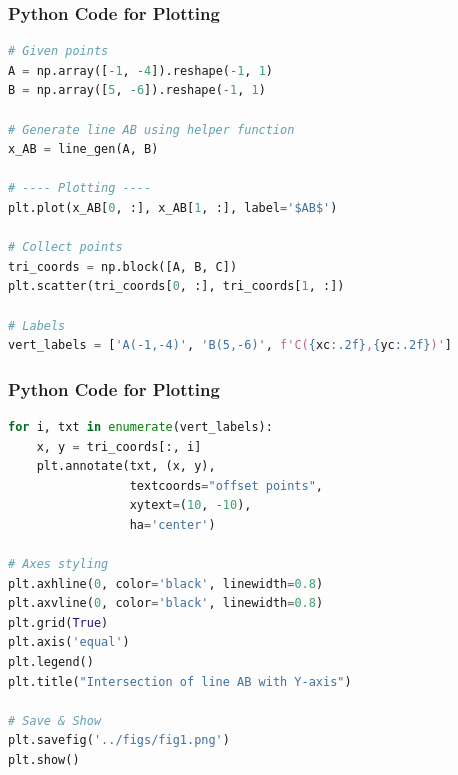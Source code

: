 \documentclass{beamer}
\theoremstyle{remark}
\numberwithin{equation}{section}
\begin{document}
\begin{frame}[fragile]
\frametitle{Python Code for Plotting}
\begin{lstlisting}[language=Python]
# Given points
A = np.array([-1, -4]).reshape(-1, 1)
B = np.array([5, -6]).reshape(-1, 1)

# Generate line AB using helper function
x_AB = line_gen(A, B)

# ---- Plotting ----
plt.plot(x_AB[0, :], x_AB[1, :], label='$AB$')

# Collect points
tri_coords = np.block([A, B, C])
plt.scatter(tri_coords[0, :], tri_coords[1, :])

# Labels
vert_labels = ['A(-1,-4)', 'B(5,-6)', f'C({xc:.2f},{yc:.2f})']
\end{lstlisting}
\end{frame}

\begin{frame}[fragile]
\frametitle{Python Code for Plotting}
\begin{lstlisting}[language=Python]
for i, txt in enumerate(vert_labels):
    x, y = tri_coords[:, i]
    plt.annotate(txt, (x, y),
                 textcoords="offset points",
                 xytext=(10, -10),
                 ha='center')

# Axes styling
plt.axhline(0, color='black', linewidth=0.8)
plt.axvline(0, color='black', linewidth=0.8)
plt.grid(True)
plt.axis('equal')
plt.legend()
plt.title("Intersection of line AB with Y-axis")

# Save & Show
plt.savefig('../figs/fig1.png')
plt.show()
\end{lstlisting}
\end{frame}
\end{document}
